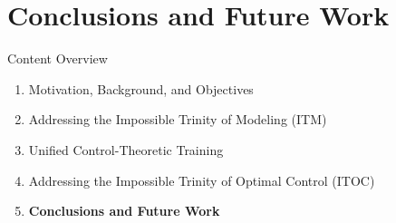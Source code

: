 \section{Conclusions and Future Work}

\begin{frame}{Content Overview}
    \footnotesize
    \begin{enumerate}
        \item \textcolor{gray!50}{Motivation, Background, and Objectives}
        \item \textcolor{gray!50}{Addressing the Impossible Trinity of Modeling (ITM)}
        \item \textcolor{gray!70}{Unified Control-Theoretic Training}
        \item \textcolor{gray!50}{Addressing the Impossible Trinity of Optimal Control (ITOC)}
        \item \colorbox{yellow!70}{\textbf{Conclusions and Future Work}}
    \end{enumerate}
\end{frame}

